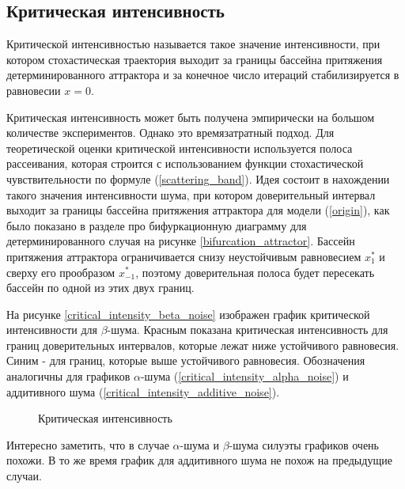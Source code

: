 \subsection{Критическая интенсивность}

    Критической интенсивностью называется такое значение интенсивности, при котором стохастическая траектория выходит за границы бассейна притяжения детерминированного аттрактора и за конечное число итераций стабилизируется в равновесии \(x = 0\).

    Критическая интенсивность может быть получена эмпирически на большом количестве экспериментов. Однако это времязатратный подход. Для теоретической оценки критической интенсивности используется полоса рассеивания, которая строится с использованием функции стохастической чувствительности по формуле (\ref{scattering_band}). Идея состоит в нахождении такого значения интенсивности шума, при котором доверительный интервал выходит за границы бассейна притяжения аттрактора для модели (\ref{origin}), как было показано в разделе про бифуркационную диаграмму для детерминированного случая на рисунке \ref{bifurcation_attractor}. Бассейн притяжения аттрактора ограничивается снизу неустойчивым равновесием \(x_1^*\) и сверху его прообразом \(x_{-1}^*\), поэтому доверительная полоса будет пересекать бассейн по одной из этих двух границ.

    На рисунке \ref{critical_intensity_beta_noise} изображен график критической интенсивности для \(\beta\)-шума. Красным показана критическая интенсивность для границ доверительных интервалов, которые лежат ниже устойчивого равновесия. Синим - для границ, которые выше устойчивого равновесия. Обозначения аналогичны для графиков \(\alpha\)-шума (\ref{critical_intensity_alpha_noise}) и аддитивного шума (\ref{critical_intensity_additive_noise}).


    \begin{figure}
        \centering
        
            
        \caption{Критическая интенсивность}
    \end{figure}

    Интересно заметить, что в случае \(\alpha\)-шума и \(\beta\)-шума силуэты графиков очень похожи. В то же время график для аддитивного шума не похож на предыдущие случаи. 
